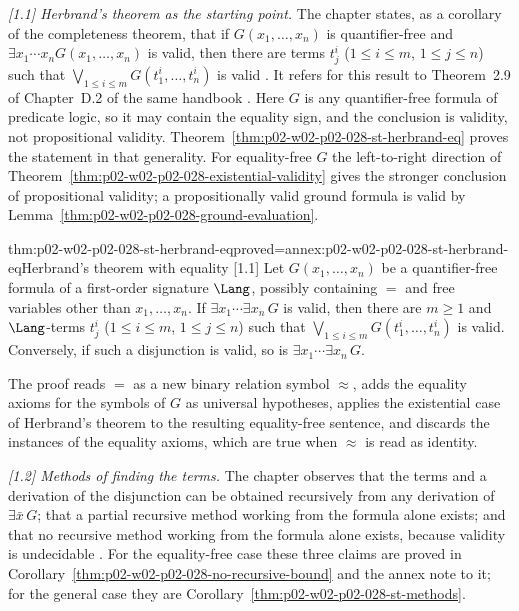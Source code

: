 \emph{[1.1] Herbrand's theorem as the starting point.}  The chapter states, as
a corollary of the completeness theorem, that if \(G(x_1,\ldots,x_n)\) is
quantifier-free and \(\exists x_1\cdots x_nG(x_1,\ldots,x_n)\) is valid, then
there are terms \(t^i_j\) (\(1\leq i\leq m\), \(1\leq j\leq n\)) such that
\(\bigvee_{1\leq i\leq m}G(t^i_1,\ldots,t^i_n)\) is valid
\cite[\S1.1, p.~898]{Statman1977}.  It refers for this result to Theorem~2.9
of Chapter~D.2 of the same handbook \cite[Theorem~2.9, p.~876]{Schwichtenberg1977}.
Here \(G\) is any quantifier-free formula of predicate logic, so it may
contain the equality sign, and the conclusion is validity, not propositional
validity.  Theorem~\ref{thm:p02-w02-p02-028-st-herbrand-eq} proves the
statement in that generality.  For equality-free \(G\) the left-to-right
direction of Theorem~\ref{thm:p02-w02-p02-028-existential-validity} gives the
stronger conclusion of propositional validity; a propositionally valid ground
formula is valid by Lemma~\ref{thm:p02-w02-p02-028-ground-evaluation}.

\begin{hbtheorem}{thm:p02-w02-p02-028-st-herbrand-eq}{proved=annex:p02-w02-p02-028-st-herbrand-eq}{Herbrand's theorem with equality [1.1]}
Let \(G(x_1,\ldots,x_n)\) be a quantifier-free formula of a first-order
signature \(\Lang\), possibly containing \(=\) and free variables other than
\(x_1,\ldots,x_n\).  If \(\exists x_1\cdots\exists x_n\,G\) is valid, then
there are \(m\geq1\) and \(\Lang\)-terms \(t^i_j\)
(\(1\leq i\leq m\), \(1\leq j\leq n\)) such that
\(\bigvee_{1\leq i\leq m}G(t^i_1,\ldots,t^i_n)\) is valid.  Conversely, if
such a disjunction is valid, so is \(\exists x_1\cdots\exists x_n\,G\).
\end{hbtheorem}

The proof reads \(=\) as a new binary relation symbol \(\approx\), adds the
equality axioms for the symbols of \(G\) as universal hypotheses, applies the
existential case of Herbrand's theorem to the resulting equality-free
sentence, and discards the instances of the equality axioms, which are true
when \(\approx\) is read as identity.

\emph{[1.2] Methods of finding the terms.}  The chapter observes that the terms
and a derivation of the disjunction can be obtained recursively from any
derivation of \(\exists\bar x\,G\); that a partial recursive method working
from the formula alone exists; and that no recursive method working from the
formula alone exists, because validity is undecidable
\cite[\S1.2, p.~898]{Statman1977}.  For the equality-free case these three
claims are proved in Corollary~\ref{thm:p02-w02-p02-028-no-recursive-bound}
and the annex note to it; for the general case they are
Corollary~\ref{thm:p02-w02-p02-028-st-methods}.

